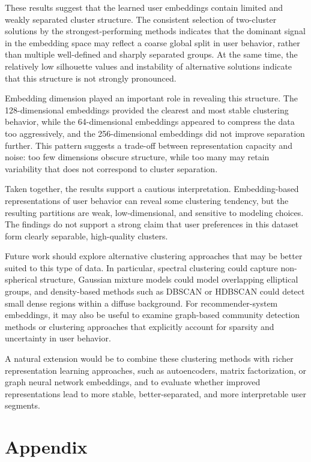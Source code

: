 \documentclass[
  11pt,
  letterpaper,
  DIV=11,
  numbers=noendperiod]{scrartcl}
\begin{document}
These results suggest that the learned user embeddings contain limited
and weakly separated cluster structure. The consistent selection of
two-cluster solutions by the strongest-performing methods indicates that
the dominant signal in the embedding space may reflect a coarse global
split in user behavior, rather than multiple well-defined and sharply
separated groups. At the same time, the relatively low silhouette values
and instability of alternative solutions indicate that this structure is
not strongly pronounced.

Embedding dimension played an important role in revealing this
structure. The 128-dimensional embeddings provided the clearest and most
stable clustering behavior, while the 64-dimensional embeddings appeared
to compress the data too aggressively, and the 256-dimensional
embeddings did not improve separation further. This pattern suggests a
trade-off between representation capacity and noise: too few dimensions
obscure structure, while too many may retain variability that does not
correspond to cluster separation.

Taken together, the results support a cautious interpretation.
Embedding-based representations of user behavior can reveal some
clustering tendency, but the resulting partitions are weak,
low-dimensional, and sensitive to modeling choices. The findings do not
support a strong claim that user preferences in this dataset form
clearly separable, high-quality clusters.

Future work should explore alternative clustering approaches that may be
better suited to this type of data. In particular, spectral clustering
could capture non-spherical structure, Gaussian mixture models could
model overlapping elliptical groups, and density-based methods such as
DBSCAN or HDBSCAN could detect small dense regions within a diffuse
background. For recommender-system embeddings, it may also be useful to
examine graph-based community detection methods or clustering approaches
that explicitly account for sparsity and uncertainty in user behavior.

A natural extension would be to combine these clustering methods with
richer representation learning approaches, such as autoencoders, matrix
factorization, or graph neural network embeddings, and to evaluate
whether improved representations lead to more stable, better-separated,
and more interpretable user segments.

\section{Appendix}\label{sec-appendix}
\end{document}
